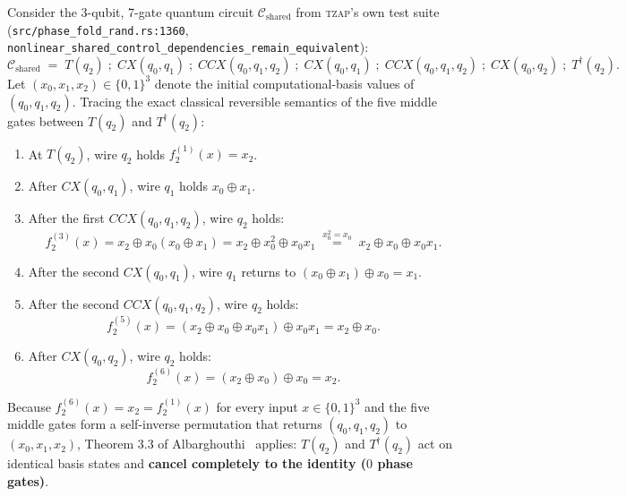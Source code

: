 \documentclass[11pt,a4paper]{article}
\theoremstyle{definition}
\begin{document}
Consider the 3-qubit, 7-gate quantum circuit $\mathcal{C}_{\mathrm{shared}}$ from \textsc{tzap}'s own test suite (\texttt{src/phase\_fold\_rand.rs:1360}, \texttt{nonlinear\_shared\_control\_dependencies\_remain\_equivalent}):
\[
  \mathcal{C}_{\mathrm{shared}} \;=\; T(q_2) \;;\; \mathit{CX}(q_0, q_1) \;;\; \mathit{CCX}(q_0, q_1, q_2) \;;\; \mathit{CX}(q_0, q_1) \;;\; \mathit{CCX}(q_0, q_1, q_2) \;;\; \mathit{CX}(q_0, q_2) \;;\; T^\dagger(q_2).
\]
Let $(x_0, x_1, x_2) \in \{0,1\}^3$ denote the initial computational-basis values of $(q_0, q_1, q_2)$. Tracing the exact classical reversible semantics of the five middle gates between $T(q_2)$ and $T^\dagger(q_2)$:
\begin{enumerate}
  \item At $T(q_2)$, wire $q_2$ holds $f_2^{(1)}(x) = x_2$.
  \item After $\mathit{CX}(q_0, q_1)$, wire $q_1$ holds $x_0 \oplus x_1$.
  \item After the first $\mathit{CCX}(q_0, q_1, q_2)$, wire $q_2$ holds:
  \[
    f_2^{(3)}(x) = x_2 \oplus x_0(x_0 \oplus x_1) = x_2 \oplus x_0^2 \oplus x_0 x_1 \;\stackrel{x_0^2 = x_0}{=}\; x_2 \oplus x_0 \oplus x_0 x_1.
  \]
  \item After the second $\mathit{CX}(q_0, q_1)$, wire $q_1$ returns to $(x_0 \oplus x_1) \oplus x_0 = x_1$.
  \item After the second $\mathit{CCX}(q_0, q_1, q_2)$, wire $q_2$ holds:
  \[
    f_2^{(5)}(x) = (x_2 \oplus x_0 \oplus x_0 x_1) \oplus x_0 x_1 = x_2 \oplus x_0.
  \]
  \item After $\mathit{CX}(q_0, q_2)$, wire $q_2$ holds:
  \[
    f_2^{(6)}(x) = (x_2 \oplus x_0) \oplus x_0 = x_2.
  \]
\end{enumerate}
Because $f_2^{(6)}(x) = x_2 = f_2^{(1)}(x)$ for every input $x \in \{0,1\}^3$ and the five middle gates form a self-inverse permutation that returns $(q_0, q_1, q_2)$ to $(x_0, x_1, x_2)$, Theorem 3.3 of Albarghouthi~\cite{albarghouthi2026rand} applies: $T(q_2)$ and $T^\dagger(q_2)$ act on identical basis states and \textbf{cancel completely to the identity ($0$ phase gates)}.
\end{document}
